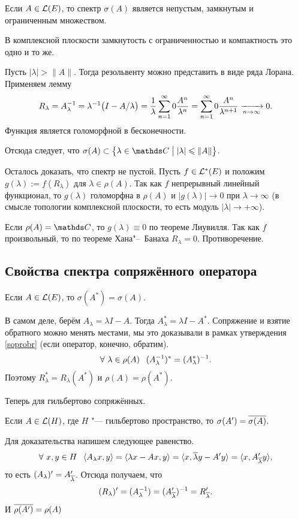 \begin{Sl}
  Если $A\in \mathcal L(E)$, то спектр $\sigma(A)$ является непустым, замкнутым и ограниченным множеством.
\end{Sl}
В комплексной плоскости замкнутость с ограниченностью и компактность это одно и то же.
\begin{Proof}
 Пусть $|\lambda|>\|A\|$. Тогда резольвенту можно представить в виде ряда Лорана. Применяем лемму
\[
  R_\lambda = A_\lambda^{-1}=\lambda^{-1}\big(I-A/\lambda\big) = \frac1\lambda \sum\limits_{{n}={1}}^\infty0\frac{A^n}{\lambda^n} = 
  \sum\limits_{{n}={1}}^\infty0\frac{A^n}{\lambda^{n+1}}\xrightarrow[n\rightarrow\infty]{}0.
\]
Функция является голоморфной в бесконечности.

Отсюда следует, что $\sigma(A)\subset \big\{\lambda\in \C\bigm| |\lambda|\le \|A\|\big\}$.

Осталось доказать, что спектр не пустой. Пусть $f\in\mathcal L^*(E)$ и положим $g(\lambda):=f(R_\lambda)$ для $\lambda\in \rho(A)$. Так как $f$ непрерывный линейный функционал, то $g(\lambda)$ голоморфна в $\rho(A)$ и $\big|g(\lambda)\big|\to0$ при $\lambda\to\infty$ (в смысле топологии комплексной плоскости, то есть модуль $|\lambda|\to+\infty$).

Если $\rho(A) = \C$, то $g(\lambda)\equiv 0$ по теореме Лиувилля. Так как $f$ произвольный, то по теореме Хана"--~Банаха $R_\lambda=0$. Противоречение.
\end{Proof}

\subsection{Свойства спектра сопряжённого оператора}
\begin{Ut}
  Если $A\in\mathcal L(E)$, то $\sigma(A^*) = \sigma(A)$. 
\end{Ut}
\begin{Proof}
В самом деле, берём $A_\lambda = \lambda I - A$. Тогда $A_\lambda^* = \lambda I - A^*$. Сопряжение и взятие обратного можно менять местами, мы это доказывали в рамках утверждения \ref{soprobr} (если оператор, конечно, обратим).
\[
  \forall\ \lambda\in \rho(A)\hskip .75em plus.1em minus.08em\relax (
  A^{-1}_\lambda)^*
  = 
  (A^{*}_\lambda)^{-1}.
\]
Поэтому $R^*_\lambda = R_\lambda(A^*)$ и $\rho(A) = \rho(A^*)$.
\end{Proof}

Теперь для гильбертово сопряжённых.
\begin{Ut}
  Если $A\in \mathcal L(H)$, где $H$ "--- гильбертово пространство, то $\sigma(A') = \overline{\sigma(A)}$.
\end{Ut}
\begin{Proof}
Для доказательства напишем следующее равенство.
\[
  \forall\ x,y\in H\hskip .75em plus.1em minus.08em\relax 
   \langle A_\lambda x,y\rangle = \langle \lambda x - A x,y\rangle = 
   \langle x,\overline{\lambda} y - A' y\rangle = 
   \langle x,A'_{\overline{\lambda}} y\rangle,
\]
то есть $(A_\lambda)' = A'_{\overline{\lambda}}$. Отсюда получаем, что 
\[
  (R_\lambda)' = (A^{-1}_\lambda) = 
  (A'_{\overline{\lambda}})^{-1} = R'_{\overline{\lambda}}.
\]
И $\overline{\rho(A')} = \rho(A)$
\end{Proof}

